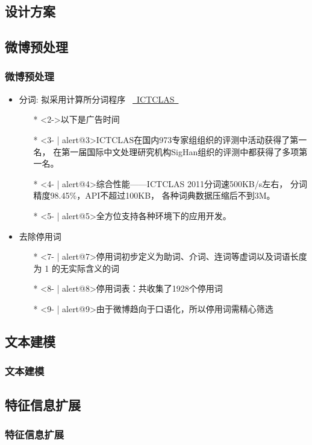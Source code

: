 \documentclass[CJK, table]{beamer}
\begin{document}
\begin{CJK}{UTF8}{gbsn}
\section{设计方案}
\subsection{微博预处理}
\begin{frame}
  \frametitle{微博预处理}
  \begin{itemize}
    \item<1- | alert@1>{分词: 拟采用计算所分词程序
      ~\href{http://ictclas.org/}{~ICTCLAS~}}
      \begin{itemize}
        \item[*]<2->{以下是广告时间\smiley}
        \item[*]<3- | alert@3>{ICTCLAS在国内973专家组组织的评测中活动获得了第一名，
          在第一届国际中文处理研究机构SigHan组织的评测中都获得了多项第一名。}
        \item[*]<4- | alert@4>{综合性能——ICTCLAS 2011分词速500KB/s左右，
          分词精度98.45\%，API不超过100KB，
          各种词典数据压缩后不到3M。}
        \item[*]<5- | alert@5>{全方位支持各种环境下的应用开发。}
      \end{itemize}
    \item<6- | alert@6>{去除停用词}
      \begin{itemize}
        \item[*]<7- | alert@7>{停用词初步定义为助词、介词、连词等虚词以及词语长度为
          1 的无实际含义的词}
        \item[*]<8- | alert@8>{停用词表：共收集了1928个停用词}
        \item[*]<9- | alert@9>{由于微博趋向于口语化，所以停用词需精心筛选}
      \end{itemize}
  \end{itemize}
\end{frame}

\subsection{文本建模}
\begin{frame}
  \frametitle{文本建模}
\end{frame}

\subsection{特征信息扩展}
\begin{frame}
  \frametitle{特征信息扩展}
\end{frame}


\end{CJK}
\end{document}
